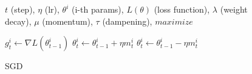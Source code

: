\begin{figure}[t]
\begin{algorithm}[H]
    \caption{SGD}\label{algorithm:sgd}
    \footnotesize
    \begin{algorithmic}[1]
        \Require $t$ (step), $\eta$ (lr), $\theta^i$ (i-th params), $L(\theta)$ (loss function), $\lambda$ (weight decay), $\mu$ (momentum), $\tau$ (dampening),  $maximize$ 
        
        \Repeat
            \State $g^i_t \gets \nabla L(\theta^i_{t-1})$
            \State 
            \State {}
            \State {}
            \State
            \State {}
            \Else
            \EndIf
            \State
                \State $\theta^i_t \gets \theta^i_{t-1} + \eta m^i_t$
            \Else
                \State $\theta^i_t \gets \theta^i_{t-1} - \eta m^i_t$
            \EndIf
        \EndFor
    \end{algorithmic}
\end{algorithm}
\end{figure}


